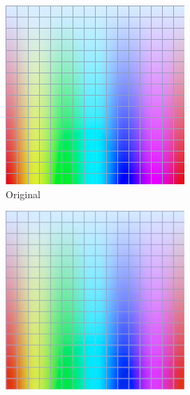 \begin{figure}[t]
	\centering
	\captionsetup[subfigure]{font=footnotesize,labelfont=footnotesize}
	\captionsetup[subfigure]{justification=centering}
	\begin{subfigure}[t]{0.22\textwidth}
		\includegraphics[width=\linewidth]{img/upsampling_texture_original.png}
		\caption{Original\\ }
		\label{fig:sigUpliftOriginal}
	\end{subfigure} \hspace{0.1em}
	\begin{subfigure}[t]{0.22\textwidth}
		\includegraphics[width=\linewidth]{img/upsampling_texture_copyNeighbor.png}

\end{subfigure}
\end{figure}
